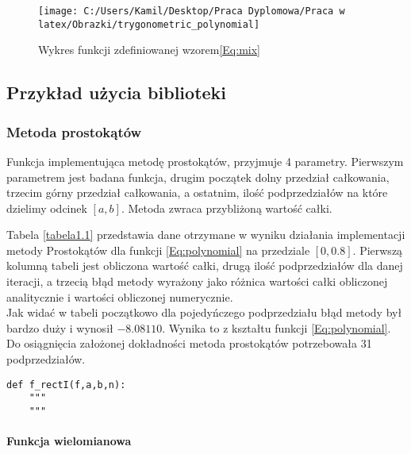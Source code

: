 \documentclass[12pt,twoside]{article}
\begin{document}
\begin{figure}
\texttt{[image: C:/Users/Kamil/Desktop/Praca Dyplomowa/Praca w latex/Obrazki/trygonometric\_polynomial]}
\caption{Wykres funkcji zdefiniowanej wzorem\eqref{Eq:mix}}
\end{figure}

\subsection{Przykład użycia biblioteki}
\subsubsection{Metoda prostokątów}
	Funkcja implementująca metodę prostokątów, przyjmuje 4 parametry. Pierwszym parametrem jest badana funkcja, drugim początek dolny przedział całkowania, trzecim górny przedział całkowania, a ostatnim, ilość podprzedziałów na które dzielimy odcinek $[a,b]$. Metoda zwraca przybliżoną wartość całki.
	
	Tabela \eqref{tabela1.1} przedstawia dane otrzymane w wyniku działania implementacji metody Prostokątów dla funkcji \eqref{Eq:polynomial} na przedziale $[0,0.8]$.
	Pierwszą kolumną tabeli jest obliczona wartość całki, drugą ilość podprzedziałów dla danej iteracji, a trzecią błąd metody wyrażony jako różnica wartości całki obliczonej 			analitycznie i wartości obliczonej numerycznie.\\
	Jak widać w tabeli początkowo dla pojedyńczego podprzedziału błąd metody był bardzo duży i wynosił $-8.08110$. Wynika to z kształtu funkcji \eqref{Eq:polynomial}.\\
	Do osiągnięcia założonej dokładności metoda prostokątów potrzebowała 31 podprzedziałów.
	
\begin{lstlisting}[caption={Kod w języku python implementujący metodę prostokątów}]
def f_rectI(f,a,b,n):
    """
    """
\end{lstlisting}
\label{Listing 6}


\paragraph{Funkcja wielomianowa}
\end{document}
